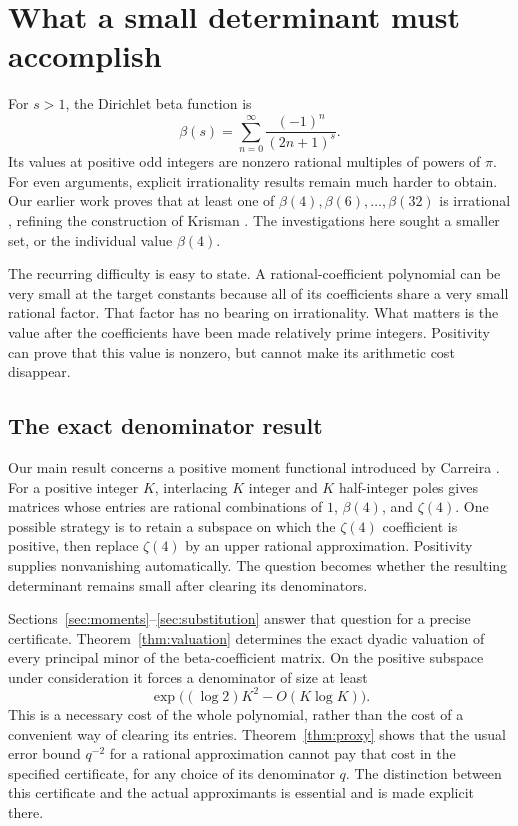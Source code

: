 \section{What a small determinant must accomplish}
For $s>1$, the Dirichlet beta function is
\[
 \beta(s)=\sum_{n=0}^{\infty}\frac{(-1)^n}{(2n+1)^s}.
\]
Its values at positive odd integers are nonzero rational multiples of
powers of $\pi$. For even arguments, explicit irrationality results
remain much harder to obtain. Our earlier work proves that at least one
of $\beta(4),\beta(6),\ldots,\beta(32)$ is irrational
\cite{fifteen}, refining the construction of Krisman \cite{Krisman}.
The investigations here sought a smaller set, or the individual value
$\beta(4)$.

The recurring difficulty is easy to state. A rational-coefficient
polynomial can be very small at the target constants because all of
its coefficients share a very small rational factor. That factor has
no bearing on irrationality. What matters is the value after the
coefficients have been made relatively prime integers. Positivity can
prove that this value is nonzero, but cannot make its arithmetic cost
disappear.

\subsection{The exact denominator result}
Our main result concerns a positive moment functional introduced by
Carreira \cite[Section~11]{Carreira}. For a positive integer $K$,
interlacing $K$ integer and $K$ half-integer poles gives matrices
whose entries are rational combinations
of $1$, $\beta(4)$, and $\zeta(4)$. One possible strategy is to retain
a subspace on which the $\zeta(4)$ coefficient is positive, then replace
$\zeta(4)$ by an upper rational approximation. Positivity supplies
nonvanishing automatically. The question becomes whether the resulting
determinant remains small after clearing its denominators.

Sections~\ref{sec:moments}--\ref{sec:substitution} answer that question
for a precise certificate. Theorem~\ref{thm:valuation} determines the
exact dyadic valuation of every principal minor of the beta-coefficient
matrix. On the positive subspace under consideration it forces a
denominator of size at least
\[
 \exp\bigl((\log 2)K^2-O(K\log K)\bigr).
\]
This is a necessary cost of the whole polynomial, rather than the cost
of a convenient way of clearing its entries. Theorem~\ref{thm:proxy}
shows that the usual error bound $q^{-2}$ for a rational approximation
cannot pay that cost in the specified certificate, for any choice of
its denominator $q$. The distinction between this certificate and the
actual approximants is essential and is made explicit there.

